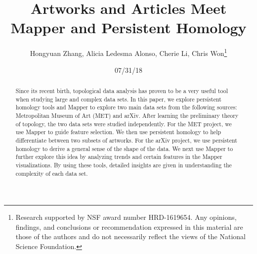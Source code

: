 \documentclass[12pt]{article}
\title{Artworks and Articles Meet Mapper and Persistent Homology}
\date{07/31/18}
\author{Hongyuan Zhang, Alicia Ledesma Alonso, Cherie Li, Chris Won\thanks{Research supported by NSF award number HRD-1619654. Any opinions, findings, and conclusions or recommendation expressed in this material are those of the authors and do not necessarily reflect the views of the National Science Foundation.}}
\theoremstyle{definition}
\begin{document}
\maketitle

\begin{abstract}
	Since its recent birth, topological data analysis has proven to be a very useful tool when studying large and complex data sets. In this paper, we explore persistent homology tools and Mapper to explore two main data sets from the following sources: Metropolitan Museum of Art (MET) and arXiv. After learning the preliminary theory of topology, the two data sets were studied independently. For the MET project, we use Mapper to guide feature selection. We then use persistent homology to help differentiate between two subsets of artworks. For the arXiv project, we use persistent homology to derive a general sense of the shape of the data. We next use Mapper to further explore this idea by analyzing trends and certain features in the Mapper visualizations. By using these tools, detailed insights are given in understanding the complexity of each data set. 
\end{abstract}
\end{document}
